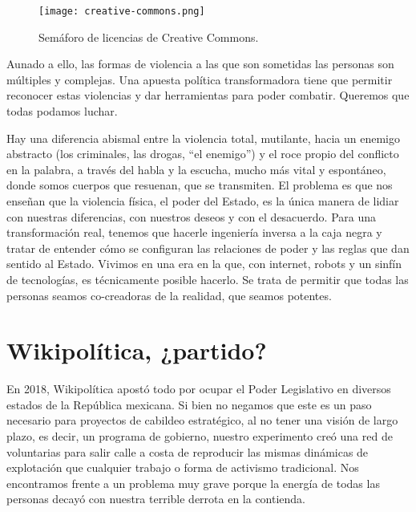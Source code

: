 \begin{figure}[htbp]
	\centering	\texttt{[image: creative-commons.png]}
	\caption{Semáforo de licencias de Creative Commons.}
	\label{fig:CCsignal}
\end{figure}

Aunado a ello, las formas de violencia a las que son sometidas las personas son múltiples y complejas. Una apuesta política transformadora tiene que permitir reconocer estas violencias y dar herramientas para poder combatir. Queremos que todas podamos luchar.

Hay una diferencia abismal entre la violencia total, mutilante, hacia un enemigo abstracto (los criminales, las drogas, \enquote{el enemigo}) y el roce propio del conflicto en la palabra, a través del habla y la escucha, mucho más vital y espontáneo, donde somos cuerpos que resuenan, que se transmiten. El problema es que nos enseñan que la violencia física, el poder del Estado, es la única manera de lidiar con nuestras diferencias, con nuestros deseos y con el desacuerdo. Para una transformación real, tenemos que hacerle ingeniería inversa a la caja negra y tratar de entender cómo se configuran las relaciones de poder y las reglas que dan sentido al Estado. Vivimos en una era en la que, con internet, robots y un sinfín de tecnologías, es técnicamente posible hacerlo. Se trata de permitir que todas las personas seamos co-creadoras de la realidad, que seamos potentes.

\section{Wikipolítica, ¿partido?}
\label{sec:wikipartido}

En 2018, Wikipolítica apostó todo por ocupar el Poder Legislativo en diversos estados de la República mexicana. Si bien no negamos que este es un paso necesario para proyectos de cabildeo estratégico, al no tener una visión de largo plazo, es decir, un programa de gobierno, nuestro experimento creó una red de voluntarias para salir calle a costa de reproducir las mismas dinámicas de explotación que cualquier trabajo o forma de activismo tradicional. Nos encontramos frente a un problema muy grave porque la energía de todas las personas decayó con nuestra terrible derrota en la contienda.

